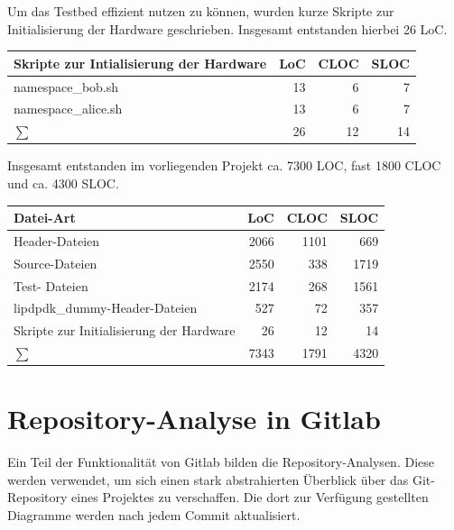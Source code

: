 \documentclass[../review_3.tex]{subfiles}
\begin{document}
Um das Testbed effizient nutzen zu können, wurden kurze Skripte zur Initialisierung der Hardware geschrieben. Insgesamt entstanden hierbei 26 LoC.
\begin{longtable}[H]{p{10cm}rrr} \toprule
    \textbf{Skripte zur Intialisierung der Hardware} & \textbf{LoC} & \textbf{CLOC} & \textbf{SLOC} \\ \midrule \endhead
    namespace\_bob.sh                                & 13           & 6             & 7             \\
    namespace\_alice.sh                              & 13           & 6             & 7             \\
    \midrule
    $\sum$                                           & 26           & 12            & 14            \\ \bottomrule
\end{longtable}
Insgesamt entstanden im vorliegenden Projekt ca. 7300 LOC, fast 1800 CLOC und ca. 4300 SLOC.
\begin{longtable} [H]{p{10cm}rrr}
    \toprule
    \textbf{Datei-Art}                       & \textbf{LoC} & \textbf{CLOC} & \textbf{SLOC} \\ \midrule \endhead
    Header-Dateien                           & 2066         & 1101          & 669           \\
    Source-Dateien                           & 2550         & 338           & 1719          \\
    Test- Dateien                            & 2174         & 268           & 1561          \\
    lipdpdk\_dummy-Header-Dateien            & 527          & 72            & 357           \\
    Skripte zur Initialisierung der Hardware & 26           & 12            & 14            \\\midrule
    $\sum$                                   & 7343         & 1791          & 4320          \\ \bottomrule
\end{longtable}

\section{Repository-Analyse in Gitlab}
Ein Teil der Funktionalität von Gitlab bilden die Repository-Analysen. Diese werden verwendet, um sich  einen stark abstrahierten Überblick über das Git-Repository eines Projektes zu verschaffen. Die dort zur Verfügung gestellten Diagramme werden nach jedem Commit aktualisiert.
\end{document}
